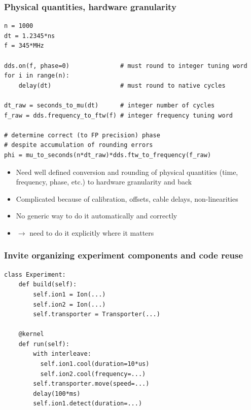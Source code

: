 \documentclass[final,presentation,compress]{beamer}
\begin{document}
\begin{frame}[fragile]
  \frametitle{Physical quantities, hardware granularity}
  \footnotesize
  \begin{verbatim}
n = 1000
dt = 1.2345*ns
f = 345*MHz

dds.on(f, phase=0)              # must round to integer tuning word
for i in range(n):
    delay(dt)                   # must round to native cycles

dt_raw = seconds_to_mu(dt)      # integer number of cycles
f_raw = dds.frequency_to_ftw(f) # integer frequency tuning word

# determine correct (to FP precision) phase
# despite accumulation of rounding errors
phi = mu_to_seconds(n*dt_raw)*dds.ftw_to_frequency(f_raw)
  \end{verbatim}

  \begin{itemize}
    \item Need well defined conversion and rounding of physical quantities
      (time, frequency, phase, etc.) to hardware granularity and back
    \item Complicated because of calibration, offsets, cable delays,
      non-linearities
    \item No generic way to do it automatically and correctly
    \item $\rightarrow$ need to do it explicitly where it matters
  \end{itemize}
\end{frame}


\begin{frame}[fragile]
  \frametitle{Invite organizing experiment components and code reuse}
  \footnotesize

  \begin{verbatim}
class Experiment:
    def build(self):
        self.ion1 = Ion(...)
        self.ion2 = Ion(...)
        self.transporter = Transporter(...)

    @kernel
    def run(self):
        with interleave:
          self.ion1.cool(duration=10*us)
          self.ion2.cool(frequency=...)
        self.transporter.move(speed=...)
        delay(100*ms)
        self.ion1.detect(duration=...)
  \end{verbatim}
\end{frame}
\end{document}
